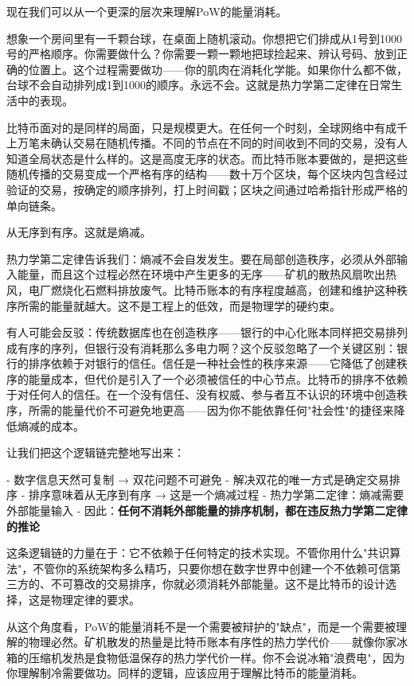 \documentclass[a4paper,12pt,openany]{ctexbook}
\begin{document}
现在我们可以从一个更深的层次来理解PoW的能量消耗。

想象一个房间里有一千颗台球，在桌面上随机滚动。你想把它们排成从1号到1000号的严格顺序。你需要做什么？你需要一颗一颗地把球捡起来、辨认号码、放到正确的位置上。这个过程需要做功——你的肌肉在消耗化学能。如果你什么都不做，台球不会自动排列成1到1000的顺序。永远不会。这就是热力学第二定律在日常生活中的表现。

比特币面对的是同样的局面，只是规模更大。在任何一个时刻，全球网络中有成千上万笔未确认交易在随机传播。不同的节点在不同的时间收到不同的交易，没有人知道全局状态是什么样的。这是高度无序的状态。而比特币账本要做的，是把这些随机传播的交易变成一个严格有序的结构——数十万个区块，每个区块内包含经过验证的交易，按确定的顺序排列，打上时间戳；区块之间通过哈希指针形成严格的单向链条。

从无序到有序。这就是熵减。

热力学第二定律告诉我们：熵减不会自发发生。要在局部创造秩序，必须从外部输入能量，而且这个过程必然在环境中产生更多的无序——矿机的散热风扇吹出热风，电厂燃烧化石燃料排放废气。比特币账本的有序程度越高，创建和维护这种秩序所需的能量就越大。这不是工程上的低效，而是物理学的硬约束。

有人可能会反驳：传统数据库也在创造秩序——银行的中心化账本同样把交易排列成有序的序列，但银行没有消耗那么多电力啊？这个反驳忽略了一个关键区别：银行的排序依赖于对银行的信任。信任是一种社会性的秩序来源——它降低了创建秩序的能量成本，但代价是引入了一个必须被信任的中心节点。比特币的排序不依赖于对任何人的信任。在一个没有信任、没有权威、参与者互不认识的环境中创造秩序，所需的能量代价不可避免地更高——因为你不能依靠任何"社会性"的捷径来降低熵减的成本。

让我们把这个逻辑链完整地写出来：

- 数字信息天然可复制 → 双花问题不可避免
- 解决双花的唯一方式是确定交易排序
- 排序意味着从无序到有序 → 这是一个熵减过程
- 热力学第二定律：熵减需要外部能量输入
- 因此：\textbf{任何不消耗外部能量的排序机制，都在违反热力学第二定律的推论}

这条逻辑链的力量在于：它不依赖于任何特定的技术实现。不管你用什么"共识算法"，不管你的系统架构多么精巧，只要你想在数字世界中创建一个不依赖可信第三方的、不可篡改的交易排序，你就必须消耗外部能量。这不是比特币的设计选择，这是物理定律的要求。

从这个角度看，PoW的能量消耗不是一个需要被辩护的"缺点"，而是一个需要被理解的物理必然。矿机散发的热量是比特币账本有序性的热力学代价——就像你家冰箱的压缩机发热是食物低温保存的热力学代价一样。你不会说冰箱"浪费电"，因为你理解制冷需要做功。同样的逻辑，应该应用于理解比特币的能量消耗。
\end{document}
